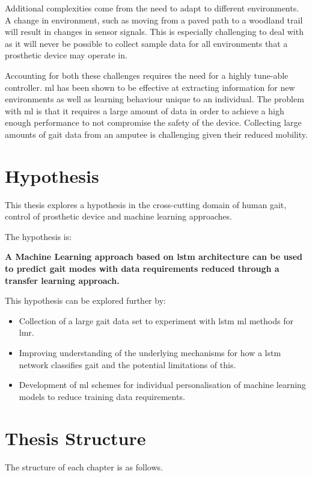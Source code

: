 Additional complexities come from the need to adapt to different environments. A change in environment, such as moving from a paved path to a woodland trail will result in changes in sensor signals. This is especially challenging to deal with as it will never be possible to collect sample data for all environments that a prosthetic device may operate in.

Accounting for both these challenges requires the need for a highly tune-able controller. \acrfull{ml} has been shown to be effective at extracting information for new environments as well as learning behaviour unique to an individual. The problem with \acrshort{ml} is that it requires a large amount of data in order to achieve a high enough performance to not compromise the safety of the device. Collecting large amounts of gait data from an amputee is challenging given their reduced mobility.

\section{Hypothesis} %
This thesis explores a hypothesis in the cross-cutting domain of human gait, control of prosthetic device and machine learning approaches.

The hypothesis is:

\textbf{A Machine Learning approach based on \acrfull{lstm} architecture can be used to predict gait modes with data requirements reduced through a transfer learning approach.}

This hypothesis can be explored further by:

\begin{itemize}
    \item Collection of a large gait data set to experiment with \acrshort{lstm} \acrshort{ml} methods for \acrfull{lmr}.
    \item Improving understanding of the underlying mechanisms for how a \acrshort{lstm} network classifies gait and the potential limitations of this.
    \item Development of \acrshort{ml} schemes for individual personalisation of machine learning models to reduce training data requirements.
\end{itemize}


\section{Thesis Structure}
The structure of each chapter is as follows.

